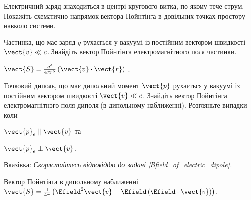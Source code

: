

\begin{problem}
    Електричний заряд знаходиться в центрі кругового витка, по якому тече струм. Покажіть схематично напрямок вектора Пойнтінга в довільних точках простору навколо системи.
\end{problem}

\begin{problem}
    Частинка, що має заряд $q$ рухається у вакуумі із постійним вектором швидкості $\vect{v} \ll c$. Знайдіть вектор Пойнтінга електромагнітного поля частинки.
\begin{solution}
	$\vect{S} = \frac{q^2}{4\pi r^5} \left( \vect{v} \cdot \vect{r}\right)$ .
\end{solution}
\end{problem}

\begin{problem}
    Точковий диполь, що має дипольний момент $\vect{p}$ рухається у вакуумі із постійним вектором швидкості $\vect{v} \ll c$. Знайдіть вектор Пойнтінга електромагнітного поля диполя (в дипольному наближенні). Розгляньте випадки коли
	\begin{enumerate*}[label=\alph*)]
		\item 	$\vect{p}_e \parallel \vect{v}$ та
		\item   $\vect{p}_e \perp \vect{v}$.
	\end{enumerate*}

	Вказівка: \emph{Скористайтесь відповіддю до задачі \ref{Bfield_of_electric_dipole}.}
\begin{solution}
	Вектор Пойнтінга в дипольному наближенні $\vect{S} = \frac{1}{4\pi} \left( \Efield^2 \vect{v} - \Efield\left(\Efield\cdot\vect{v} \right) \right) $.
\end{solution}
\end{problem}


